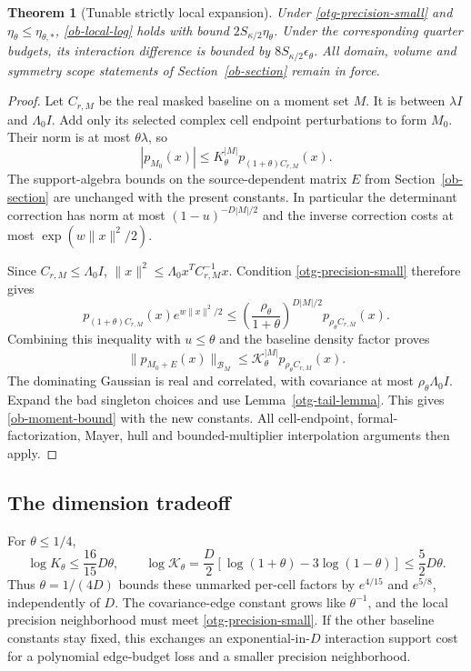 \documentclass[11pt]{article}
\newtheorem{theorem}{Theorem}[section]
\begin{document}
\begin{theorem}[Tunable strictly local expansion]\label{otg-strict-theorem}
Under \eqref{otg-precision-small} and
$\mathcal\eta_\theta\le\mathcal\eta_{\theta,*}$,
\eqref{ob-local-log} holds with bound
$2S_{\kappa/2}\mathcal\eta_\theta$.
Under the corresponding quarter budgets, its interaction
difference is bounded by
$8S_{\kappa/2}\mathcal\epsilon_\theta$.
All domain, volume and symmetry scope statements of
Section~\ref{ob-section} remain in force.
\end{theorem}
\begin{proof}
Let $C_{r,M}$ be the real masked baseline on a moment set $M$.
It is between $\lambda I$ and $\Lambda_0I$.
Add only its selected complex cell endpoint perturbations to
form $M_0$. Their norm is at most $\theta\lambda$, so
\[
 |p_{M_0}(x)|
          \le K_\theta^{|M|}p_{(1+\theta)C_{r,M}}(x).
\]
The support-algebra bounds on the source-dependent matrix
$E$ from Section~\ref{ob-section} are unchanged with the
present constants. In particular the determinant correction
has norm at most $(1-u)^{-D|M|/2}$ and the inverse correction
costs at most $\exp(w\|x\|^2/2)$.

Since $C_{r,M}\le\Lambda_0I$,
$\|x\|^2\le\Lambda_0x^TC_{r,M}^{-1}x$.
Condition \eqref{otg-precision-small} therefore gives
\[
 p_{(1+\theta)C_{r,M}}(x)e^{w\|x\|^2/2}
 \le\left(\frac{\rho_\theta}{1+\theta}\right)^{D|M|/2}
                                  p_{\rho_\theta C_{r,M}}(x).
\]
Combining this inequality with $u\le\theta$ and the
baseline density factor proves
\begin{equation}\label{otg-algebra-density}
 \|p_{M_0+E}(x)\|_{\mathcal B_M}
       \le\mathcal K_\theta^{|M|}
                                  p_{\rho_\theta C_{r,M}}(x).
\end{equation}
The dominating Gaussian is real and correlated, with
covariance at most $\rho_\theta\Lambda_0I$.
Expand the bad singleton choices and use
Lemma~\ref{otg-tail-lemma}. This gives
\eqref{ob-moment-bound} with the new constants.
All cell-endpoint, formal-factorization, Mayer, hull and
bounded-multiplier interpolation arguments then apply.
\end{proof}

\subsection{The dimension tradeoff}

For $\theta\le1/4$,
\[
 \log K_\theta\le\frac{16}{15}D\theta,\qquad
 \log\mathcal K_\theta
 =\frac D2[\log(1+\theta)-3\log(1-\theta)]
                   \le\frac52D\theta .
\]
Thus $\theta=1/(4D)$ bounds these unmarked per-cell factors
by $e^{4/15}$ and $e^{5/8}$, independently of $D$.
The covariance-edge constant grows like $\theta^{-1}$,
and the local precision neighborhood must meet
\eqref{otg-precision-small}. If the other baseline constants
stay fixed, this exchanges an exponential-in-$D$ interaction
support cost for a polynomial edge-budget loss and a smaller
precision neighborhood.
\end{document}
